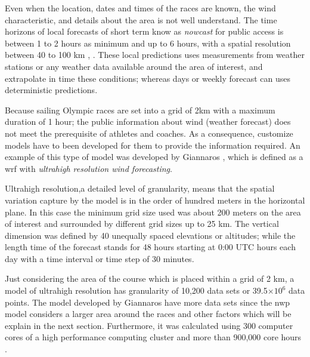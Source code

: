 Even when the location, dates and times of the races are known, the wind characteristic, and details about the area is not well understand. The time horizons of local forecasts of short term know as \textit{nowcast} for public access is between 1 to 2 hours as minimum and up to 6 hours, with a spatial resolution between 40 to 100 km \cite{warner2010numerical}, \cite{kristensen2010weather}. These local predictions uses measurements from weather stations or any weather data available around the area of interest, and extrapolate in time these conditions;
whereas days or weekly forecast can uses deterministic predictions.\par
Because sailing Olympic races are set into a grid of 2km with a maximum duration of 1 hour; the public information about wind (weather forecast) does not meet the prerequisite of athletes and coaches. As a consequence, customize models have to been developed for them to provide the information required. An example of this type of model was developed by Giannaros \cite{giannaros2018ultrahigh}, which is defined as a \acrshort{wrf} with \textit{ultrahigh resolution wind forecasting}.\par 
Ultrahigh resolution,a detailed level of granularity, means that the spatial variation capture by the model is in the order of hundred meters in the horizontal plane. In this case the minimum grid size used was about 200 meters on the area of interest and surrounded by different grid sizes up to 25 km. The vertical dimension was defined by 40 unequally spaced elevations or altitudes; while the length time of the forecast stands for 48 hours starting at 0:00 UTC hours each day with a time interval or time step of 30 minutes. \par \noindent 
Just considering the area of the course which is placed within a grid of 2 km, a model of ultrahigh resolution has granularity of 10,200 data sets or 39.5$\times 10^6$ data points. The model developed by Giannaros have more data sets since the \acrshort{nwp} model considers a larger area around the races and other factors which will be explain in the next section. Furthermore, it
was calculated using 300 computer cores of a high performance computing cluster and more than 900,000 core hours \cite{giannaros2018ultrahigh}. 

